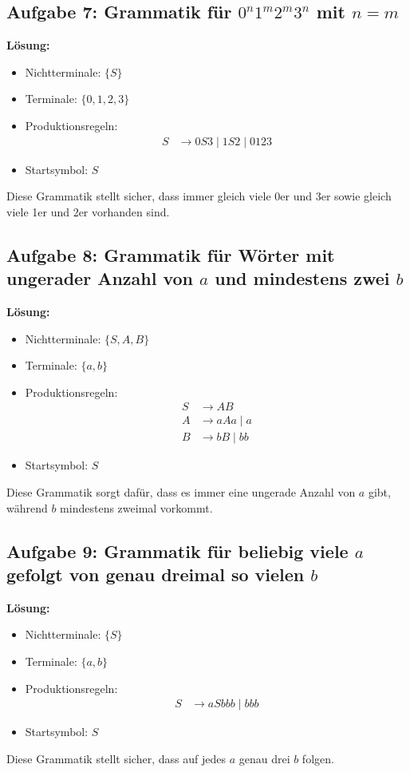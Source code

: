 \documentclass[a4paper,12pt]{article}
\begin{document}
	\subsection*{Aufgabe 7: Grammatik für $0^n 1^m 2^m 3^n$ mit $n = m$}
	\textbf{Lösung:}
	\begin{itemize}
		\item Nichtterminale: $\{S\}$
		\item Terminale: $\{0,1,2,3\}$
		\item Produktionsregeln:
		\begin{align*}
			S &\rightarrow 0 S 3 \mid 1 S 2 \mid 01 23
		\end{align*}
		\item Startsymbol: $S$
	\end{itemize}
	Diese Grammatik stellt sicher, dass immer gleich viele 0er und 3er sowie gleich viele 1er und 2er vorhanden sind.
	
	\subsection*{Aufgabe 8: Grammatik für Wörter mit ungerader Anzahl von $a$ und mindestens zwei $b$}
	\textbf{Lösung:}
	\begin{itemize}
		\item Nichtterminale: $\{S, A, B\}$
		\item Terminale: $\{a, b\}$
		\item Produktionsregeln:
		\begin{align*}
			S &\rightarrow A B \\
			A &\rightarrow a A a \mid a \\
			B &\rightarrow b B \mid bb
		\end{align*}
		\item Startsymbol: $S$
	\end{itemize}
	Diese Grammatik sorgt dafür, dass es immer eine ungerade Anzahl von $a$ gibt, während $b$ mindestens zweimal vorkommt.
	
	\subsection*{Aufgabe 9: Grammatik für beliebig viele $a$ gefolgt von genau dreimal so vielen $b$}
	\textbf{Lösung:}
	\begin{itemize}
		\item Nichtterminale: $\{S\}$
		\item Terminale: $\{a, b\}$
		\item Produktionsregeln:
		\begin{align*}
			S &\rightarrow a S bbb \mid bbb
		\end{align*}
		\item Startsymbol: $S$
	\end{itemize}
	Diese Grammatik stellt sicher, dass auf jedes $a$ genau drei $b$ folgen.
	
\end{document}
